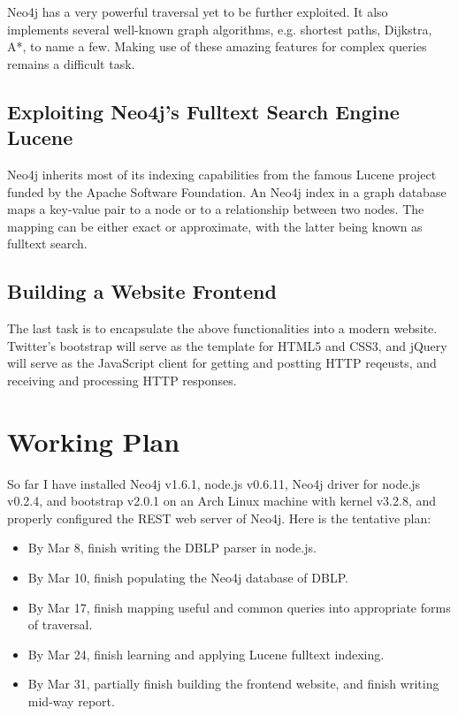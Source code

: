 \documentclass[10pt, conference, compsocconf]{../IEEEtran}
\begin{document}
Neo4j has a very powerful traversal yet to be further exploited. It also implements several well-known graph algorithms, e.g. shortest paths, Dijkstra, A*, to name a few. Making use of these amazing features for complex queries remains a difficult task.

\subsection{Exploiting Neo4j's Fulltext Search Engine Lucene}

Neo4j inherits most of its indexing capabilities from the famous Lucene project funded by the Apache Software Foundation. An Neo4j index in a graph database maps a key-value pair to a node or to a relationship between two nodes. The mapping can be either exact or approximate, with the latter being known as fulltext search.

\subsection{Building a Website Frontend}

The last task is to encapsulate the above functionalities into a modern website. Twitter's bootstrap will serve as the template for HTML5 and CSS3, and jQuery will serve as the JavaScript client for getting and postting HTTP reqeusts, and receiving and processing HTTP responses.

\section{Working Plan}

So far I have installed Neo4j v1.6.1, node.js v0.6.11, Neo4j driver for node.js v0.2.4, and bootstrap v2.0.1 on an Arch Linux machine with kernel v3.2.8, and properly configured the REST web server of Neo4j. Here is the tentative plan:

\begin{itemize}
\item By Mar 8, finish writing the DBLP parser in node.js.
\item By Mar 10, finish populating the Neo4j database of DBLP.
\item By Mar 17, finish mapping useful and common queries into appropriate forms of traversal.
\item By Mar 24, finish learning and applying Lucene fulltext indexing.
\item By Mar 31, partially finish building the frontend website, and finish writing mid-way report.
\end{itemize}
\end{document}
